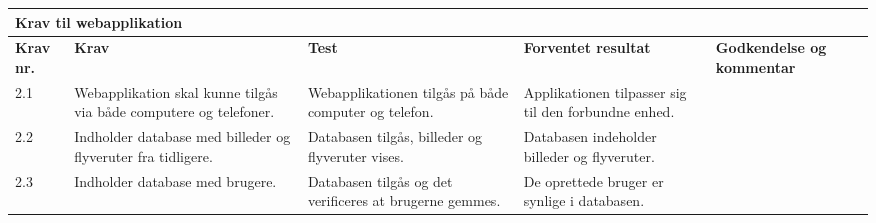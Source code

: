 \begin{sideways}
    \centering
    \begin{tabular}{|l|p{4.5 cm}|p{4.5 cm}|p{4.5 cm}|p{4.5 cm}|p{2 cm}|}
			\hline
			\multicolumn{5}{|l|}{\textbf{Krav til webapplikation}}\\ \hline
			\textbf{Krav nr.} & \textbf{Krav} & \textbf{Test} & \textbf{Forventet \newline resultat} & 			
			\textbf{Godkendelse \newline og kommentar} \\ \hline
			
			2.1 & Webapplikation skal kunne tilgås via både computere og telefoner.
				& Webapplikationen tilgås på både computer og telefon.
				& Applikationen tilpasser sig til den forbundne enhed.
				& \\ \hline

			2.2 & Indholder database med billeder og flyveruter fra tidligere. 
				& Databasen tilgås, billeder og flyveruter vises.
				& Databasen indeholder billeder og flyveruter.
				&  \\ \hline
			
			2.3 & Indholder database med brugere.
				& Databasen tilgås og det verificeres at brugerne gemmes.
				& De oprettede bruger er synlige i databasen.
				& \\ \hline				
		\end{tabular}
	\label{tab:krav_1}
\end{sideways}


